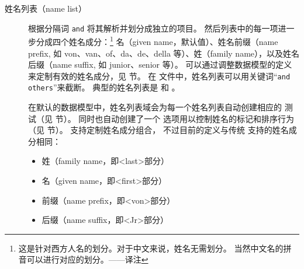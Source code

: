 \begin{description}


\item[姓名列表（name list）] 根据分隔词 \texttt{and} 将其解析并划分成独立的项目。
然后列表中的每一项进一步分成四个姓名成分：\footnote{
	这是针对西方人名的划分。对于中文来说，姓名无需划分。
	当然中文名的拼音可以进行对应的划分。——译注}
名（given name，默认值）、姓名前缀（name prefix, 如 von、van、of、da、de、della 等）、姓（family name），以及姓名后缀（name suffix, 如 junior、senior 等）。
可以通过调整数据模型的定义来定制有效的姓名成分，见  节。
在  文件中，姓名列表可以用关键词“\texttt{and others}”来截断。
典型的姓名列表是  和 。


在默认的数据模型中，姓名列表域会为每一个姓名列表自动创建相应的  测试（见  节）。
同时也自动创建了一个  选项用以控制姓名的标记和排序行为（见  节）。
\biber 支持定制姓名成分组合，
不过目前的定义与传统 \BibTeX 支持的姓名成分相同：

\begin{itemize}
	\item 姓（family name，即<last>部分）%
	\item 名（given name，即<first>部分） %
	\item 前缀（name prefix，即<von>部分）%
	\item 后缀（name suffix，即<Jr>部分）%
\end{itemize}


\end{description}
